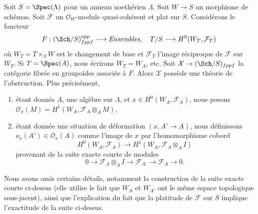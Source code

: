 \begin{example}
\label{example-global-sections}
Soit $S = \Spec(\Lambda)$ pour un anneau noethérien $\Lambda$.
Soit $W \to S$ un morphisme de schémas. Soit $\mathcal{F}$
un $\mathcal{O}_W$-module quasi-cohérent et plat sur $S$.
Considérons le foncteur
$$
F : (\Sch/S)_{fppf}^{opp} \longrightarrow \textit{Ensembles},
\quad
T/S \longrightarrow H^0(W_T, \mathcal{F}_T)
$$
où $W_T = T \times_S W$ est le changement de base et $\mathcal{F}_T$
l'image réciproque de $\mathcal{F}$ sur $W_T$. Si $T = \Spec(A)$,
nous écrirons $W_T = W_A$, etc. Soit $\mathcal{X} \to (\Sch/S)_{fppf}$
la catégorie fibrée en groupoïdes associée à $F$. Alors
$\mathcal{X}$ possède une théorie de l'obstruction. Plus précisément,
\begin{enumerate}
\item étant donnés $A$, une algèbre sur $\Lambda$, et
$x \in H^0(W_A, \mathcal{F}_A)$, nous posons
$\mathcal{O}_x(M) = H^1(W_A, \mathcal{F}_A \otimes_A M)$,
\item étant donnée une situation de déformation $(x, A' \to A)$, nous définissons
$o_x(A') \in \mathcal{O}_x(A)$ comme l'image de $x$ par l'homomorphisme cobord
$$
H^0(W_A, \mathcal{F}_A) \longrightarrow H^1(W_A, \mathcal{F}_A \otimes_A I)
$$
provenant de la suite exacte courte de modules
$$
0 \to \mathcal{F}_A \otimes_A I \to
\mathcal{F}_{A'} \to \mathcal{F}_A \to 0.
$$
\end{enumerate}
Nous avons omis certains détails, notamment la construction de la suite
exacte courte ci-dessus (elle utilise le fait que $W_A$ et $W_{A'}$ ont le même
espace topologique sous-jacent), ainsi que l'explication du fait que la platitude
de $\mathcal{F}$ sur $S$ implique l'exactitude de la suite ci-dessus.
\end{example}

